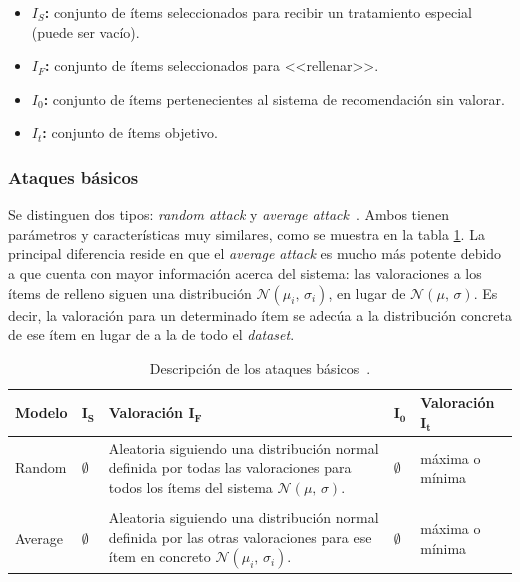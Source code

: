 \begin{itemize}
	
	\item \textbf{$I_S$:} conjunto de ítems seleccionados para recibir un tratamiento especial (puede ser vacío).
	\item \textbf{$I_F$:} conjunto de ítems seleccionados para <<rellenar>>.
	\item \textbf{$I_0$:} conjunto de ítems pertenecientes al sistema de recomendación sin valorar.
	\item \textbf{$I_t$:} conjunto de ítems objetivo.
	
\end{itemize}


\subsubsection{Ataques básicos}

Se distinguen dos tipos: \textit{random attack} y \textit{average attack}~\cite{mingdan2018ShillingAttacksAReview}. Ambos tienen parámetros y características muy similares, como se muestra en la tabla \ref{tabla_descripcion_ataques_basicos}. La principal diferencia reside en que el \textit{average attack} es mucho más potente debido a que cuenta con mayor información acerca del sistema: las valoraciones a los ítems de relleno siguen una distribución $\mathcal{N}(\mu_i,\,\sigma_i)$, en lugar de $\mathcal{N}(\mu,\,\sigma)$. Es decir, la valoración para un determinado ítem se adecúa a la distribución concreta de ese ítem en lugar de a la de todo el \textit{dataset}.


\begin{table}
\small
\begin{centering}

		\begin{tabular}{@{}p{5em} p{2em} p{14em} p{2em} p{7em}@{}}
		\toprule
		\textbf{Modelo} & $\mathbf{I_S}$ & \textbf{Valoración} $\mathbf{I_F}$ & \hfil $\mathbf{I_0}$ & \textbf{Valoración} $\mathbf{I_t}$\\ 
		\midrule
	
		Random & $\emptyset$ & Aleatoria siguiendo una distribución normal definida por todas las valoraciones para todos los ítems del sistema $\mathcal{N}(\mu,\,\sigma)$. & \hfil $\emptyset$ & máxima o mínima \\\\
		
		Average & $\emptyset$ & Aleatoria siguiendo una distribución normal definida por las otras valoraciones para ese ítem en concreto $\mathcal{N}(\mu_i,\,\sigma_i)$. & \hfil $\emptyset$ & máxima o mínima\\
		\bottomrule
		\end{tabular}
	
\end{centering}
\caption[Sistemas de recomendación: ataques básicos]{Descripción de los ataques básicos~\cite{zhou2021SemisupervisedRecommendationAttack}.}
\label{tabla_descripcion_ataques_basicos}	
\end{table}


